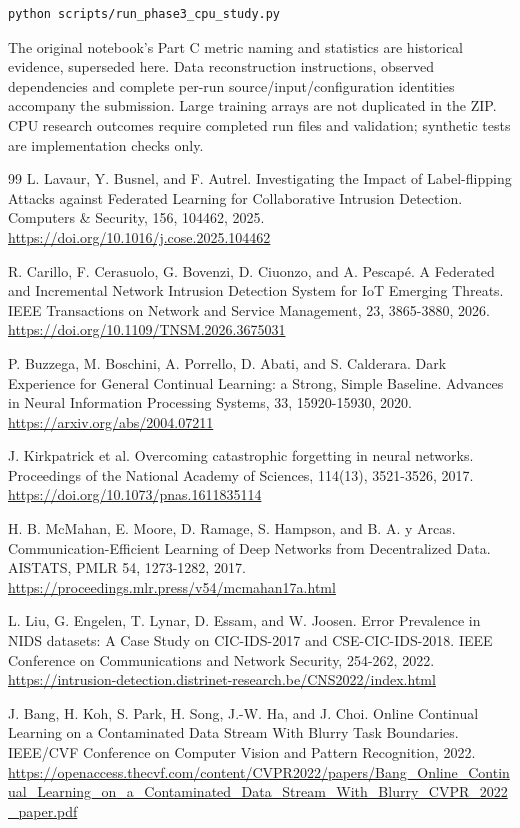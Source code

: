 \documentclass[
  10pt,
  a4paper,
]{article}
\begin{document}
\begin{verbatim}
python scripts/run_phase3_cpu_study.py
\end{verbatim}

The original notebook's Part C metric naming and statistics are
historical evidence, superseded here. Data reconstruction instructions,
observed dependencies and complete per-run source/input/configuration
identities accompany the submission. Large training arrays are not
duplicated in the ZIP. CPU research outcomes require completed run files
and validation; synthetic tests are implementation checks only.

\begin{thebibliography}{99}
 L. Lavaur, Y. Busnel, and F. Autrel. Investigating the Impact of Label-flipping Attacks against Federated Learning for Collaborative Intrusion Detection. Computers \& Security, 156, 104462, 2025. \url{https://doi.org/10.1016/j.cose.2025.104462}

 R. Carillo, F. Cerasuolo, G. Bovenzi, D. Ciuonzo, and A. Pescapé. A Federated and Incremental Network Intrusion Detection System for IoT Emerging Threats. IEEE Transactions on Network and Service Management, 23, 3865-3880, 2026. \url{https://doi.org/10.1109/TNSM.2026.3675031}

 P. Buzzega, M. Boschini, A. Porrello, D. Abati, and S. Calderara. Dark Experience for General Continual Learning: a Strong, Simple Baseline. Advances in Neural Information Processing Systems, 33, 15920-15930, 2020. \url{https://arxiv.org/abs/2004.07211}

 J. Kirkpatrick et al. Overcoming catastrophic forgetting in neural networks. Proceedings of the National Academy of Sciences, 114(13), 3521-3526, 2017. \url{https://doi.org/10.1073/pnas.1611835114}

 H. B. McMahan, E. Moore, D. Ramage, S. Hampson, and B. A. y Arcas. Communication-Efficient Learning of Deep Networks from Decentralized Data. AISTATS, PMLR 54, 1273-1282, 2017. \url{https://proceedings.mlr.press/v54/mcmahan17a.html}

 L. Liu, G. Engelen, T. Lynar, D. Essam, and W. Joosen. Error Prevalence in NIDS datasets: A Case Study on CIC-IDS-2017 and CSE-CIC-IDS-2018. IEEE Conference on Communications and Network Security, 254-262, 2022. \url{https://intrusion-detection.distrinet-research.be/CNS2022/index.html}

 J. Bang, H. Koh, S. Park, H. Song, J.-W. Ha, and J. Choi. Online Continual Learning on a Contaminated Data Stream With Blurry Task Boundaries. IEEE/CVF Conference on Computer Vision and Pattern Recognition, 2022. \url{https://openaccess.thecvf.com/content/CVPR2022/papers/Bang_Online_Continual_Learning_on_a_Contaminated_Data_Stream_With_Blurry_CVPR_2022_paper.pdf}


\end{thebibliography}
\end{document}
